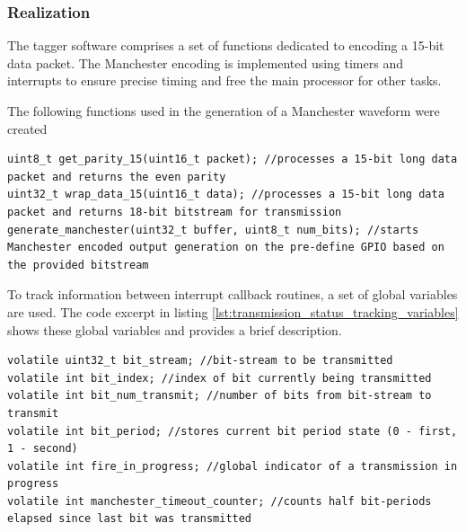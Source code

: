 \subsubsection{Realization}

The tagger software comprises a set of functions dedicated to encoding a 15-bit data packet. The Manchester encoding is implemented using timers and interrupts to ensure precise timing and free the main processor for other tasks.

The following functions used in the generation of a Manchester waveform were created

\begin{lstlisting}[style=cstyle, caption=Transmission Related Functions\label{transmission_related_functions}]
uint8_t get_parity_15(uint16_t packet); //processes a 15-bit long data packet and returns the even parity
uint32_t wrap_data_15(uint16_t data); //processes a 15-bit long data packet and returns 18-bit bitstream for transmission
generate_manchester(uint32_t buffer, uint8_t num_bits); //starts Manchester encoded output generation on the pre-define GPIO based on the provided bitstream
\end{lstlisting}


To track information between interrupt callback routines, a set of global variables are used. The code excerpt in listing \ref{lst:transmission_status_tracking_variables} shows these global variables and provides a brief description.

\begin{lstlisting}[style=cstyle, caption=Transmission Status Tracking Variables, label=lst:transmission_status_tracking_variables]
volatile uint32_t bit_stream; //bit-stream to be transmitted
volatile int bit_index; //index of bit currently being transmitted
volatile int bit_num_transmit; //number of bits from bit-stream to transmit
volatile int bit_period; //stores current bit period state (0 - first, 1 - second)
volatile int fire_in_progress; //global indicator of a transmission in progress
volatile int manchester_timeout_counter; //counts half bit-periods elapsed since last bit was transmitted
\end{lstlisting}

